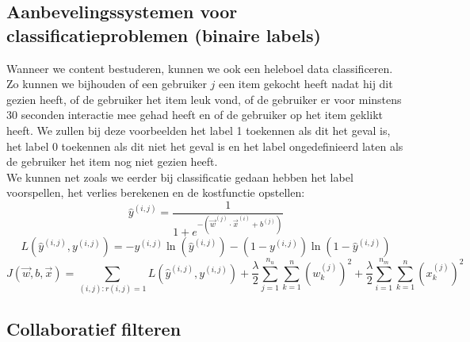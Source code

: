 \subsection{Aanbevelingssystemen voor classificatieproblemen (binaire labels)}

Wanneer we content bestuderen, kunnen we ook een heleboel data classificeren. Zo kunnen we bijhouden of een gebruiker $j$ een item gekocht heeft nadat hij dit gezien heeft, of de gebruiker het item leuk vond, of de gebruiker er voor minstens 30 seconden interactie mee gehad heeft en of de gebruiker op het item geklikt heeft. We zullen bij deze voorbeelden het label 1 toekennen als dit het geval is, het label 0 toekennen als dit niet het geval is en het label ongedefinieerd laten als de gebruiker het item nog niet gezien heeft. \\
\newline
We kunnen net zoals we eerder bij classificatie gedaan hebben het label voorspellen, het verlies berekenen en de kostfunctie opstellen:
\begin{equation}
	\hat{y}^{(i, j)} = \frac{1}{1 + e^{-(\vec{w}^{(j)} \cdot \vec{x}^{(i)} + b^{(j)})}}
\end{equation}
\begin{equation}
	L(\hat{y}^{(i, j)}, y^{(i, j)}) = -y^{(i, j)} \ln(\hat{y}^{(i, j)}) - (1 - y^{(i, j)}) \ln(1 - \hat{y}^{(i, j)}) 
\end{equation}
\begin{equation}
	J(\vec{w}, b, \vec{x}) = \sum_{(i, j):r(i, j) = 1} L(\hat{y}^{(i, j)}, y^{(i, j)})
	+ \frac{\lambda}{2} \sum_{j=1}^{n_{u}} \sum_{k=1}^{n}(w_{k}^{(j)})^{2}
	+ \frac{\lambda}{2} \sum_{i=1}^{n_{m}} \sum_{k=1}^{n}(x_{k}^{(j)})^{2}
\end{equation} 

\subsection{Collaboratief filteren}

